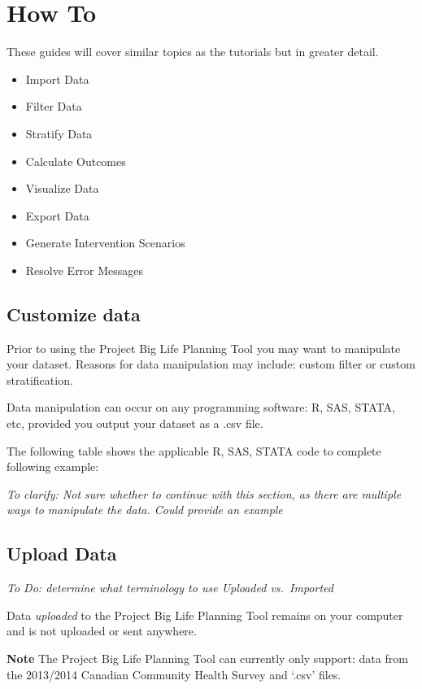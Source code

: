 \documentclass[]{book}
\providecommand{\tightlist}{%
  \setlength{\itemsep}{0pt}\setlength{\parskip}{0pt}}
\begin{document}
\chapter{How To}\label{howto}

These guides will cover similar topics as the tutorials but in greater
detail.

\begin{itemize}
\tightlist
\item
  Import Data
\item
  Filter Data
\item
  Stratify Data
\item
  Calculate Outcomes
\item
  Visualize Data
\item
  Export Data
\item
  Generate Intervention Scenarios
\item
  Resolve Error Messages
\end{itemize}

\section{Customize data}\label{customize-data}

Prior to using the Project Big Life Planning Tool you may want to
manipulate your dataset. Reasons for data manipulation may include:
custom filter or custom stratification.

Data manipulation can occur on any programming software: R, SAS, STATA,
etc, provided you output your dataset as a .csv file.

The following table shows the applicable R, SAS, STATA code to complete
following example:

\emph{To clarify: Not sure whether to continue with this section, as
there are multiple ways to manipulate the data. Could provide an
example}

\section{Upload Data}\label{upload-data}

\emph{To Do: determine what terminology to use Uploaded vs.~Imported}

Data \emph{uploaded} to the Project Big Life Planning Tool remains on
your computer and is not uploaded or sent anywhere.

\textbf{Note} The Project Big Life Planning Tool can currently only
support: data from the 2013/2014 Canadian Community Health Survey and
`.csv' files.
\end{document}

